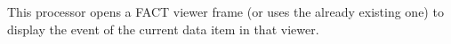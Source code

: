 This processor opens a FACT viewer frame (or uses the already existing one) to
display the event of the current data item in that viewer.